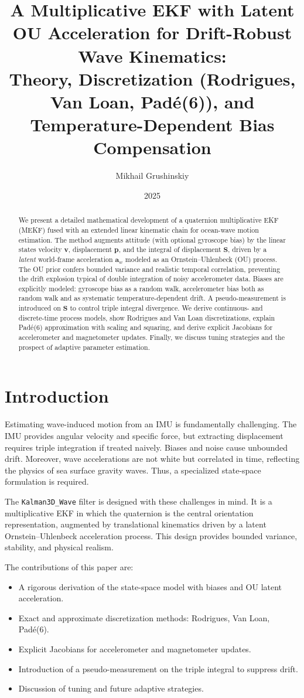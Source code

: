 \documentclass[11pt]{article}
\title{A Multiplicative EKF with Latent OU Acceleration for Drift-Robust Wave Kinematics: \\
Theory, Discretization (Rodrigues, Van Loan, Pad\'e(6)), and Temperature-Dependent Bias Compensation}
\author{Mikhail Grushinskiy}
\date{2025}
\begin{document}
\maketitle

\begin{abstract}
We present a detailed mathematical development of a quaternion multiplicative EKF (MEKF) fused with an extended 
linear kinematic chain for ocean-wave motion estimation. 
The method augments attitude (with optional gyroscope bias) by the linear states velocity $\bm v$, displacement $\bm p$, 
and the integral of displacement $\bm S$, driven by a \emph{latent} world-frame acceleration $\bm a_w$ modeled as an Ornstein--Uhlenbeck (OU) process. 
The OU prior confers bounded variance and realistic temporal correlation, preventing the drift explosion typical of double integration of noisy accelerometer data. 
Biases are explicitly modeled: gyroscope bias as a random walk, accelerometer bias both as random walk and as systematic temperature-dependent drift. 
A pseudo-measurement is introduced on $\bm S$ to control triple integral divergence. 
We derive continuous- and discrete-time process models, show Rodrigues and Van Loan discretizations, 
explain Pad\'e(6) approximation with scaling and squaring, and derive explicit Jacobians for accelerometer and magnetometer updates. 
Finally, we discuss tuning strategies and the prospect of adaptive parameter estimation.
\end{abstract}

\section{Introduction}
Estimating wave-induced motion from an IMU is fundamentally challenging. The IMU provides angular velocity and specific force, 
but extracting displacement requires triple integration if treated naively. Biases and noise cause unbounded drift. 
Moreover, wave accelerations are not white but correlated in time, reflecting the physics of sea surface gravity waves. 
Thus, a specialized state-space formulation is required. 

The \texttt{Kalman3D\_Wave} filter is designed with these challenges in mind. 
It is a multiplicative EKF in which the quaternion is the central orientation representation, 
augmented by translational kinematics driven by a latent Ornstein--Uhlenbeck acceleration process. 
This design provides bounded variance, stability, and physical realism.

The contributions of this paper are:
\begin{itemize}
\item A rigorous derivation of the state-space model with biases and OU latent acceleration.
\item Exact and approximate discretization methods: Rodrigues, Van Loan, Pad\'e(6).
\item Explicit Jacobians for accelerometer and magnetometer updates.
\item Introduction of a pseudo-measurement on the triple integral to suppress drift.
\item Discussion of tuning and future adaptive strategies.
\end{itemize}
\end{document}
